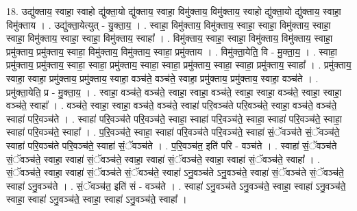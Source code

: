 \documentclass[17pt]{extarticle}
\begin{document}
18. उद्यु॑क्ताय॒ स्वाहा॒ स्वाहो द्यु॑क्ता॒यो द्यु॑क्ताय॒ स्वाहा॒ विमु॑क्ताय॒ विमु॑क्ताय॒ स्वाहो द्यु॑क्ता॒यो द्यु॑क्ताय॒ स्वाहा॒ विमु॑क्ताय । . उद्यु॑क्ता॒येत्युत् - यु॒क्ता॒य॒ । . स्वाहा॒ विमु॑क्ताय॒ विमु॑क्ताय॒ स्वाहा॒ स्वाहा॒ विमु॑क्ताय॒ स्वाहा॒ स्वाहा॒ विमु॑क्ताय॒ स्वाहा॒ स्वाहा॒ विमु॑क्ताय॒ स्वाहा᳚ । . विमु॑क्ताय॒ स्वाहा॒ स्वाहा॒ विमु॑क्ताय॒ विमु॑क्ताय॒ स्वाहा॒ प्रमु॑क्ताय॒ प्रमु॑क्ताय॒ स्वाहा॒ विमु॑क्ताय॒ विमु॑क्ताय॒ स्वाहा॒ प्रमु॑क्ताय । . विमु॑क्ता॒येति॒ वि - मु॒क्ता॒य॒ । . स्वाहा॒ प्रमु॑क्ताय॒ प्रमु॑क्ताय॒ स्वाहा॒ स्वाहा॒ प्रमु॑क्ताय॒ स्वाहा॒ स्वाहा॒ प्रमु॑क्ताय॒ स्वाहा॒ स्वाहा॒ प्रमु॑क्ताय॒ स्वाहा᳚ । . प्रमु॑क्ताय॒ स्वाहा॒ स्वाहा॒ प्रमु॑क्ताय॒ प्रमु॑क्ताय॒ स्वाहा॒ वञ्च॑ते॒ वञ्च॑ते॒ स्वाहा॒ प्रमु॑क्ताय॒ प्रमु॑क्ताय॒ स्वाहा॒ वञ्च॑ते । . प्रमु॑क्ता॒येति॒ प्र - मु॒क्ता॒य॒ । . स्वाहा॒ वञ्च॑ते॒ वञ्च॑ते॒ स्वाहा॒ स्वाहा॒ वञ्च॑ते॒ स्वाहा॒ स्वाहा॒ वञ्च॑ते॒ स्वाहा॒ स्वाहा॒ वञ्च॑ते॒ स्वाहा᳚ । . वञ्च॑ते॒ स्वाहा॒ स्वाहा॒ वञ्च॑ते॒ वञ्च॑ते॒ स्वाहा॑ परि॒वञ्च॑ते परि॒वञ्च॑ते॒ स्वाहा॒ वञ्च॑ते॒ वञ्च॑ते॒ स्वाहा॑ परि॒वञ्च॑ते । . स्वाहा॑ परि॒वञ्च॑ते परि॒वञ्च॑ते॒ स्वाहा॒ स्वाहा॑ परि॒वञ्च॑ते॒ स्वाहा॒ स्वाहा॑ परि॒वञ्च॑ते॒ स्वाहा॒ स्वाहा॑ परि॒वञ्च॑ते॒ स्वाहा᳚ । . प॒रि॒वञ्च॑ते॒ स्वाहा॒ स्वाहा॑ परि॒वञ्च॑ते परि॒वञ्च॑ते॒ स्वाहा॑ सं॒ॅवञ्च॑ते सं॒ॅवञ्च॑ते॒ स्वाहा॑ परि॒वञ्च॑ते परि॒वञ्च॑ते॒ स्वाहा॑ सं॒ॅवञ्च॑ते । . प॒रि॒वञ्च॑त॒ इति॑ परि - वञ्च॑ते । . स्वाहा॑ सं॒ॅवञ्च॑ते सं॒ॅवञ्च॑ते॒ स्वाहा॒ स्वाहा॑ सं॒ॅवञ्च॑ते॒ स्वाहा॒ स्वाहा॑ सं॒ॅवञ्च॑ते॒ स्वाहा॒ स्वाहा॑ सं॒ॅवञ्च॑ते॒ स्वाहा᳚ । . सं॒ॅवञ्च॑ते॒ स्वाहा॒ स्वाहा॑ सं॒ॅवञ्च॑ते सं॒ॅवञ्च॑ते॒ स्वाहा॑ ऽनु॒वञ्च॑ते ऽनु॒वञ्च॑ते॒ स्वाहा॑ सं॒ॅवञ्च॑ते सं॒ॅवञ्च॑ते॒ स्वाहा॑ ऽनु॒वञ्च॑ते । . सं॒ॅवञ्च॑त॒ इति॑ सं - वञ्च॑ते । . स्वाहा॑ ऽनु॒वञ्च॑ते ऽनु॒वञ्च॑ते॒ स्वाहा॒ स्वाहा॑ ऽनु॒वञ्च॑ते॒ स्वाहा॒ स्वाहा॑ ऽनु॒वञ्च॑ते॒ स्वाहा॒ स्वाहा॑ ऽनु॒वञ्च॑ते॒ स्वाहा᳚ । \newline
\end{document}
